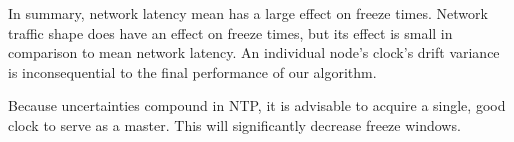 
In summary, network latency mean has a large effect on freeze
times. Network traffic shape does have an effect on freeze times, but
its effect is small in comparison to mean network latency. An individual
node's clock's drift variance is inconsequential to the final
performance of our algorithm.

Because uncertainties compound in NTP, it is advisable to
acquire a single, good clock to serve as a master. This will
significantly decrease freeze windows.


